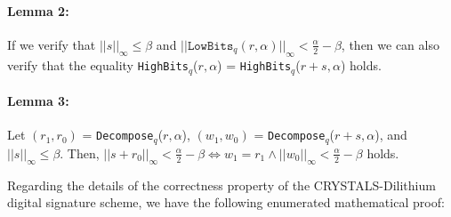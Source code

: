 \documentclass[runningheads]{llncs}
\numberwithin{equation}{section}
\begin{document}
    \paragraph{\textbf{Lemma 2:}} If we verify that ${||s||}_{\infty} \leq \beta$ and ${||\mathrm{\texttt{LowBits}}{}_{q}(r, \alpha)||}_{\infty} < \frac{\alpha}{2} - \beta$, then we can also verify that the equality \texttt{HighBits}${}_{q}$($r, \alpha$) = \texttt{HighBits}${}_{q}$($r + s, \alpha$) holds.

    \paragraph{\textbf{Lemma 3:}} Let $({r}_{1}, {r}_{0})$ = \texttt{Decompose}${}_{q}$($r, \alpha$), $({w}_{1}, {w}_{0})$ = \texttt{Decompose}${}_{q}$($r + s, \alpha$), and ${||s||}_{\infty} \leq \beta$. Then, ${||s + {r}_{0}||}_{\infty} < \frac{\alpha}{2} - \beta \Longleftrightarrow {w}_{1} = {r}_{1} \wedge {||{w}_{0}||}_{\infty} < \frac{\alpha}{2} - \beta$ holds.

    \vspace{5ex}

    \noindent Regarding the details of the correctness property of the CRYSTALS-Dilithium digital signature scheme, we have the following enumerated mathematical proof:
\end{document}
